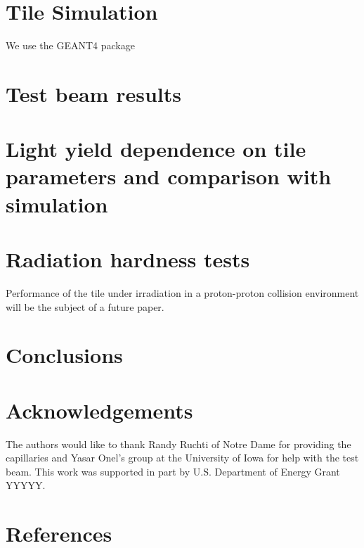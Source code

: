 \documentclass[review]{elsarticle}
\begin{document}
\section{Tile Simulation}
We use the GEANT4 package

\section{Test beam results}

\section{Light yield dependence on tile parameters and comparison with simulation}

\section{Radiation hardness tests}


Performance of the tile under irradiation in a proton-proton collision environment will be the subject of a future paper.

\section{Conclusions}

\section{Acknowledgements}
The authors would like to thank Randy Ruchti of Notre Dame for providing the capillaries and Yasar Onel's group at the University of Iowa for help with the test beam.
This work was supported in part by U.S. Department of Energy Grant YYYYY.

\section*{References}


\end{document}

